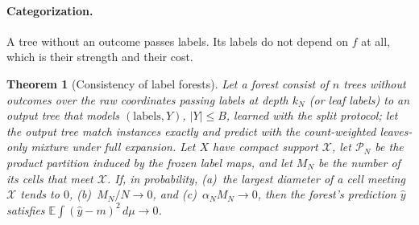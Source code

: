 \documentclass[11pt]{article}
\newtheorem{theorem}{Theorem}
\theoremstyle{definition}
\theoremstyle{remark}
\newcommand{\E}{\mathbb{E}}
\newcommand{\hy}{\hat{y}}
\begin{document}
\paragraph{Categorization.}
A tree without an outcome passes labels.  Its labels do not depend on $f$ at all, which
is their strength and their cost.

\begin{theorem}[Consistency of label forests]\label{thm:labelcons}
Let a forest consist of $n$ trees without outcomes over the raw coordinates passing labels
at depth $k_N$ (or leaf labels) to an output tree that models $(\text{labels},Y)$, $|Y|\le B$,
learned with the split protocol; let the output tree match instances exactly and
predict with the count-weighted leaves-only mixture under full expansion.  Let $X$ have
compact support $\mathcal X$, let $\mathcal P_N$ be the product partition induced by the
frozen label maps, and let $M_N$ be the number of its cells that meet $\mathcal X$.  If,
in probability, (a)~the largest diameter of a cell meeting $\mathcal X$ tends to $0$,
(b)~$M_N/N\to0$, and (c)~$\alpha_NM_N\to0$, then the forest's prediction $\hy$ satisfies
$\E\int(\hy-m)^2\,d\mu\to0$.
\end{theorem}
\end{document}
